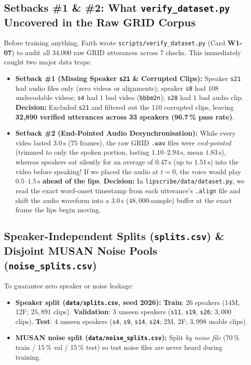 \documentclass[11pt,a4paper]{article}
\newcommand{\code}[1]{\texttt{\small #1}}
\begin{document}
\subsection{Setbacks \#1 \& \#2: What \code{verify\_dataset.py} Uncovered in the Raw GRID Corpus}
Before training anything, Faith wrote \code{scripts/verify\_dataset.py} (Card \textbf{W1-07}) to audit all 34,000 raw GRID utterances across 7 checks. This immediately caught two major data traps:
\begin{itemize}
  \item \textbf{Setback \#1 (Missing Speaker \code{s21} \& Corrupted Clips):} Speaker \code{s21} had audio files only (zero videos or alignments); speaker \code{s8} had $108$ undecodable videos; \code{s4} had $1$ bad video (\code{bbbm2n}); \code{s28} had $1$ bad audio clip. \textbf{Decision:} Excluded \code{s21} and filtered out the 110 corrupted clips, leaving \textbf{32,890 verified utterances across 33 speakers (96.7\,\% pass rate)}.
  \item \textbf{Setback \#2 (End-Pointed Audio Desynchronisation):} While every video lasted $3.0\,\text{s}$ ($75$ frames), the raw GRID \code{.wav} files were \emph{end-pointed} (trimmed to only the spoken portion, lasting $1.10\text{--}2.94\,\text{s}$, mean $1.83\,\text{s}$), whereas speakers sat silently for an average of $0.47\,\text{s}$ (up to $1.51\,\text{s}$) into the video before speaking! If we placed the audio at $t = 0$, the voice would play $0.5\text{--}1.5\,\text{s}$ \textbf{ahead of the lips}. \textbf{Decision:} In \code{lipscribe/data/dataset.py}, we read the exact word-onset timestamp from each utterance's \code{.align} file and shift the audio waveform into a $3.0\,\text{s}$ ($48{,}000$-sample) buffer at the exact frame the lips begin moving.
\end{itemize}

\subsection{Speaker-Independent Splits (\code{splits.csv}) \& Disjoint MUSAN Noise Pools (\code{noise\_splits.csv})}
To guarantee zero speaker or noise leakage:
\begin{itemize}
  \item \textbf{Speaker split (\code{data/splits.csv}, seed 2026):} \textbf{Train}: 26 speakers (14M, 12F; $25{,}891$ clips). \textbf{Validation}: 3 unseen speakers (\code{s11}, \code{s19}, \code{s26}; $3{,}000$ clips). \textbf{Test}: 4 unseen speakers (\code{s4}, \code{s9}, \code{s14}, \code{s24}; 2M, 2F; $3{,}998$ usable clips).
  \item \textbf{MUSAN noise split (\code{data/noise\_splits.csv}):} Split \emph{by noise file} (70\,\% train / 15\,\% val / 15\,\% test) so test noise files are never heard during training.
\end{itemize}
\end{document}
